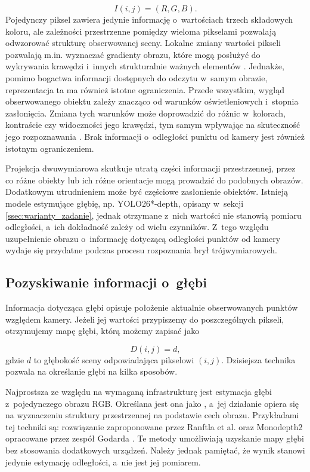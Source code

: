 \begin{equation}
    I(i,j) = (R, G, B).
\end{equation}
Pojedynczy piksel zawiera jedynie informację o~wartościach trzech składowych koloru, ale zależności przestrzenne pomiędzy wieloma pikselami pozwalają odwzorować strukturę obserwowanej sceny. Lokalne zmiany wartości pikseli pozwalają m.in. wyznaczać gradienty obrazu, które mogą posłużyć do wykrywania krawędzi i~innych strukturalnie ważnych elementów \cite{bib:sobel2014isotropic}. Jednakże, pomimo bogactwa informacji dostępnych do odczytu w~samym obrazie, reprezentacja ta ma również istotne ograniczenia. Przede wszystkim, wygląd obserwowanego obiektu zależy znacząco od warunków oświetleniowych i~stopnia zasłonięcia. Zmiana tych warunków może doprowadzić do różnic w~kolorach, kontraście czy widoczności jego krawędzi, tym samym wpływając na skuteczność jego rozpoznawania \cite{bib:szeliski2021cvalgorithms}. Brak informacji o~odległości punktu od kamery jest również istotnym ograniczeniem.

Projekcja dwuwymiarowa skutkuje utratą części informacji przestrzennej, przez co różne obiekty lub ich różne orientacje mogą prowadzić do podobnych obrazów. Dodatkowym utrudnieniem może być częściowe zasłonienie obiektów. Istnieją modele estymujące głębię, np. YOLO26*-depth, opisany w~sekcji \ref{ssec:warianty_zadanie}, jednak otrzymane z~nich wartości nie stanowią pomiaru odległości, a~ich dokładność zależy od wielu czynników. Z~tego względu uzupełnienie obrazu o~informację dotyczącą odległości punktów od kamery wydaje się przydatne podczas procesu rozpoznania brył trójwymiarowych.

\subsection{Pozyskiwanie informacji o~głębi}

Informacja dotycząca głębi opisuje położenie aktualnie obserwowanych punktów względem kamery. Jeżeli jej wartości przypiszemy do poszczególnych pikseli, otrzymujemy mapę głębi, którą możemy zapisać jako

\begin{equation}
    D(i,j) = d,
\end{equation}
gdzie $d$ to głębokość sceny odpowiadająca pikselowi $(i,j)$. Dzisiejsza technika pozwala na określanie głębi na kilka sposobów.

Najprostsza ze względu na wymaganą infrastrukturę jest estymacja głębi z~pojedynczego obrazu RGB. Określana jest ona jako , a~jej działanie opiera się na wyznaczeniu struktury przestrzennej na podstawie cech obrazu. Przykładami tej techniki są: rozwiązanie zaproponowane przez Ranftla et al. oraz Monodepth2 opracowane przez zespół Godarda \cite{bib:ranftl2022towards, bib:godard2019digging}. Te metody umożliwiają uzyskanie mapy głębi bez stosowania dodatkowych urządzeń. Należy jednak pamiętać, że wynik stanowi jedynie estymację odległości, a~nie jest jej pomiarem.

